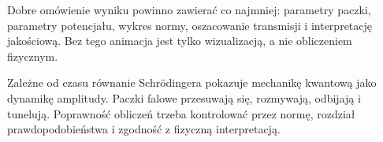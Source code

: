 Dobre omówienie wyniku powinno zawierać co najmniej: parametry paczki, parametry potencjału, wykres normy, oszacowanie transmisji i interpretację jakościową. Bez tego animacja jest tylko wizualizacją, a nie obliczeniem fizycznym.

\begin{summarybox}
Zależne od czasu równanie Schrödingera pokazuje mechanikę kwantową jako dynamikę amplitudy. Paczki falowe przesuwają się, rozmywają, odbijają i tunelują. Poprawność obliczeń trzeba kontrolować przez normę, rozdział prawdopodobieństwa i zgodność z fizyczną interpretacją.
\end{summarybox}
